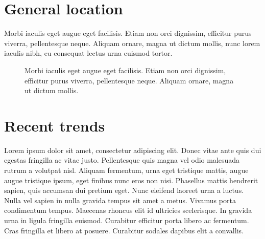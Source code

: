 \documentclass[
  letterpaper,
  oneside,
  open=any]{scrbook}
\begin{document}
\section{General location}\label{general-location}

Morbi iaculis eget augue eget facilisis. Etiam non orci dignissim,
efficitur purus viverra, pellentesque neque. Aliquam ornare, magna ut
dictum mollis, nunc lorem iaculis nibh, eu consequat lectus urna euismod
tortor.

\begin{figure}


\caption{\label{fig-map}Morbi iaculis eget augue eget facilisis. Etiam
non orci dignissim, efficitur purus viverra, pellentesque neque. Aliquam
ornare, magna ut dictum mollis.}

\end{figure}%

\section{Recent trends}\label{recent-trends}

Lorem ipsum dolor sit amet, consectetur adipiscing elit. Donec vitae
ante quis dui egestas fringilla ac vitae justo. Pellentesque quis magna
vel odio malesuada rutrum a volutpat nisl. Aliquam fermentum, urna eget
tristique mattis, augue augue tristique ipsum, eget finibus nunc eros
non nisi. Phasellus mattis hendrerit sapien, quis accumsan dui pretium
eget. Nunc eleifend laoreet urna a luctus. Nulla vel sapien in nulla
gravida tempus sit amet a metus. Vivamus porta condimentum tempus.
Maecenas rhoncus elit id ultricies scelerisque. In gravida urna in
ligula fringilla euismod. Curabitur efficitur porta libero ac fermentum.
Cras fringilla et libero at posuere. Curabitur sodales dapibus elit a
convallis.
\end{document}
